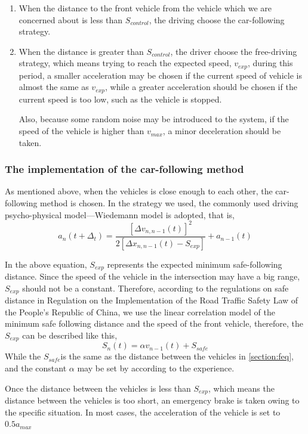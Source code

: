 \documentclass[a4paper,UTF8]{paper}
\begin{document}
\begin{enumerate}
\item When the distance to the front vehicle from the vehicle which we are concerned about is less than $S_{control}$, the driving choose the car-following strategy.

\item When the distance is greater than $S_{control}$, the driver choose the free-driving strategy, which means trying to reach the expected speed, $v_{exp}$, during this period, a smaller acceleration may be chosen if the current speed of vehicle is almost the same as $v_{exp}$, while a greater acceleration should be chosen if the current speed is too low, such as the vehicle is stopped.

Also, because some random noise may be introduced to the system, if the speed of the vehicle is higher than $v_{max}$, a minor deceleration should be taken.
\end{enumerate}
\subsubsection{The implementation of the car-following method}
\label{cf}

As mentioned above, when the vehicles is close enough to each other, the car-following method is chosen. In the strategy we used, the commonly used driving psycho-physical model—Wiedemann model is adopted, that is,
$$a_n(t+\Delta_t)=\frac{[\Delta v_{n,n-1}(t)]^2}{2[\Delta x_{n,n-1}(t)-S_{exp}]}+a_{n-1}(t)$$

In the above equation, $S_{exp}$ represents the expected minimum safe-following distance. Since the speed of the vehicle in the intersection may have a big range, $S_{exp}$ should not be a constant. Therefore, according to the regulations on safe distance in Regulation on the Implementation of the Road Traffic Safety Law of the People's Republic of China, we use the linear correlation model of the minimum safe following distance and the speed of the front vehicle, therefore, the $S_{exp}$ can be described like this,
$$S_n(t)=\alpha v_{n-1}(t)+S_{safe}$$
While the $S_{safe}$is the same as the distance between the vehicles in \ref{section:feq}, and the constant $\alpha$ may be set by according to the experience.

Once the distance between the vehicles is less than $S_{exp}$, which means the distance between the vehicles is too short, an emergency brake is taken owing to the specific situation. In most cases, the acceleration of the vehicle is set to $0.5a_{max}$
\end{document}
